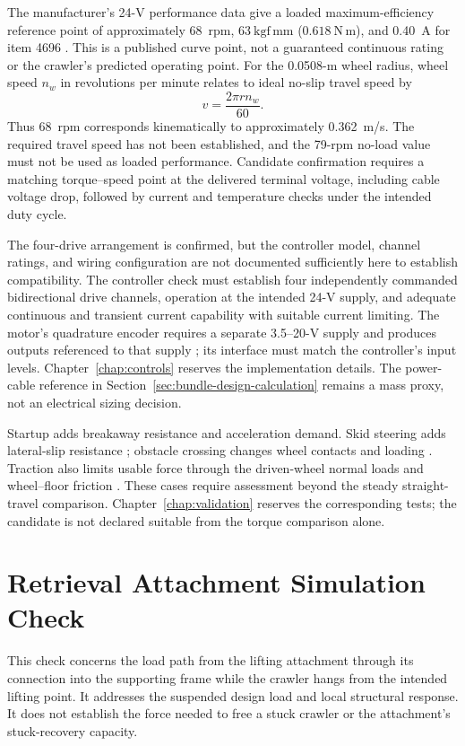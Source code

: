 The manufacturer's 24-V performance data give a loaded maximum-efficiency reference point of approximately 68~rpm, $63~\mathrm{kgf\,mm}$ ($0.618~\mathrm{N\,m}$), and 0.40~A for item 4696 \citep{pololu37dDatasheet}. This is a published curve point, not a guaranteed continuous rating or the crawler's predicted operating point. For the 0.0508-m wheel radius, wheel speed $n_w$ in revolutions per minute relates to ideal no-slip travel speed by
\begin{equation}
 v=\frac{2\pi r n_w}{60}.
 \label{eq:candidate-travel-speed}
\end{equation}
Thus 68~rpm corresponds kinematically to approximately 0.362~m/s. The required travel speed has not been established, and the 79-rpm no-load value must not be used as loaded performance. Candidate confirmation requires a matching torque--speed point at the delivered terminal voltage, including cable voltage drop, followed by current and temperature checks under the intended duty cycle.

The four-drive arrangement is confirmed, but the controller model, channel ratings, and wiring configuration are not documented sufficiently here to establish compatibility. The controller check must establish four independently commanded bidirectional drive channels, operation at the intended 24-V supply, and adequate continuous and transient current capability with suitable current limiting. The motor's quadrature encoder requires a separate 3.5--20-V supply and produces outputs referenced to that supply \citep{pololu4696}; its interface must match the controller's input levels. Chapter~\ref{chap:controls} reserves the implementation details. The power-cable reference in Section~\ref{sec:bundle-design-calculation} remains a mass proxy, not an electrical sizing decision.

Startup adds breakaway resistance and acceleration demand. Skid steering adds lateral-slip resistance \citep{mandow2007Kinematics,shamah1999SkidSteering}; obstacle crossing changes wheel contacts and loading \citep{wilhelm2007StepClimbing}. Traction also limits usable force through the driven-wheel normal loads and wheel--floor friction \citep{openstaxFriction}. These cases require assessment beyond the steady straight-travel comparison. Chapter~\ref{chap:validation} reserves the corresponding tests; the candidate is not declared suitable from the torque comparison alone.

\section{Retrieval Attachment Simulation Check}
\label{sec:retrieval-structure}
This check concerns the load path from the lifting attachment through its connection into the supporting frame while the crawler hangs from the intended lifting point. It addresses the suspended design load and local structural response. It does not establish the force needed to free a stuck crawler or the attachment's stuck-recovery capacity.

